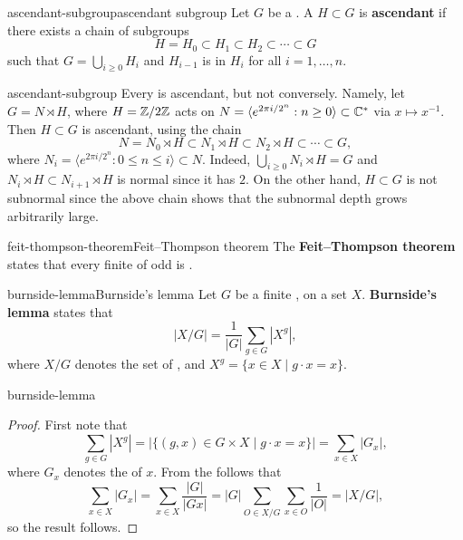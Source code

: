 \begin{topic}{ascendant-subgroup}{ascendant subgroup}
    Let $G$ be a . A  $H \subset G$ is \textbf{ascendant} if there exists a chain of subgroups
    \[ H = H_0 \subset H_1 \subset H_2 \subset \cdots \subset G \]
    such that $G = \bigcup_{i \ge 0} H_i$ and $H_{i - 1}$ is  in $H_i$ for all $i = 1, \ldots, n$.
\end{topic}

\begin{example}{ascendant-subgroup}
    Every  is ascendant, but not conversely. Namely, let $G = N \rtimes H$, where $H = \mathbb{Z}/2\mathbb{Z}$ acts on $N = \langle e^{2 \pi i / 2^n} : n \ge 0 \rangle \subset \mathbb{C}^*$ via $x \mapsto x^{-1}$. Then $H \subset G$ is ascendant, using the chain
    \[ N = N_0 \rtimes H \subset N_1 \rtimes H \subset N_2 \rtimes H \subset \cdots \subset G , \]
    where $N_i = \langle e^{2 \pi i / 2^n} : 0 \le n \le i \rangle \subset N$. Indeed, $\bigcup_{i \ge 0} N_i \rtimes H = G$ and $N_i \rtimes H \subset N_{i + 1} \rtimes H$ is normal since it has  $2$. On the other hand, $H \subset G$ is not subnormal since the above chain shows that the subnormal depth grows arbitrarily large.
\end{example}

\begin{topic}{feit-thompson-theorem}{Feit--Thompson theorem}
    The \textbf{Feit--Thompson theorem} states that every finite  of odd  is .
\end{topic}

\begin{topic}{burnside-lemma}{Burnside's lemma}
    Let $G$ be a finite ,  on a set $X$. \textbf{Burnside's lemma} states that
    \[ |X/G| = \frac{1}{|G|} \sum_{g \in G} |X^g| , \]
    where $X/G$ denotes the set of , and $X^g = \{ x \in X \mid g \cdot x = x \}$.
\end{topic}

\begin{example}{burnside-lemma}
    \begin{proof}
        First note that
        \[ \sum_{g \in G} |X^g| = |\{ (g, x) \in G \times X \mid g \cdot x = x \}| = \sum_{x \in X} |G_x| , \]
        where $G_x$ denotes the  of $x$. From the  follows that
        \[ \sum_{x \in X} |G_x| = \sum_{x \in X} \frac{|G|}{|G x|} = |G| \sum_{O \in X/G} \sum_{x \in O} \frac{1}{|O|} = |X/G| , \]
        so the result follows.
    \end{proof}
\end{example}

